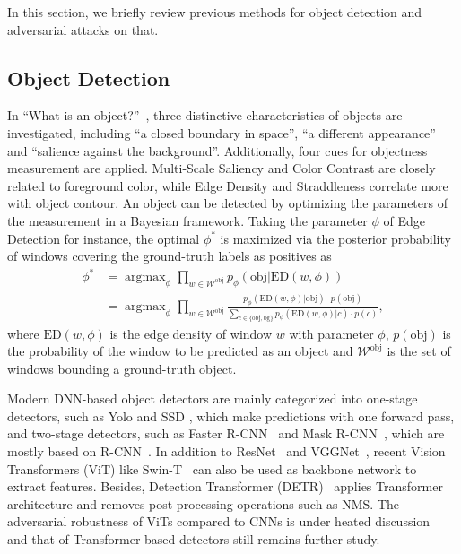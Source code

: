 \documentclass[times,twocolumn,final,authoryear]{elsarticle}
\begin{document}
In this section, we briefly review previous methods for object detection and adversarial attacks on that.

\subsection{Object Detection}
\label{sec:object}

In ``What is an object?''~\citep{alexe2010object}, three distinctive characteristics of objects are investigated, including ``a closed boundary in space'', ``a different appearance'' and ``salience against the background''. Additionally, four cues for objectness measurement are applied. Multi-Scale Saliency and Color Contrast are closely related to foreground color, while Edge Density and Straddleness correlate more with object contour. An object can be detected by optimizing the parameters of the measurement in a Bayesian framework.
Taking the parameter $\phi$ of Edge Detection for instance, the optimal $\phi^*$ is maximized via the posterior probability of windows covering the ground-truth labels as positives as
\begin{align}
\label{eq:ed}
    \phi^*&=\mathop{\arg\max}_\phi\prod_{w\in\mathcal{W}^{\text{obj}}}p_\phi(\text{obj}|\text{ED}(w,\phi)) \\
    &=\mathop{\arg\max}_\phi\prod_{w\in\mathcal{W}^{\text{obj}}}\frac{p_\phi(\text{ED}(w,\phi)|\text{obj})\cdot p(\text{obj})}{\sum_{c\in\{\text{obj},\text{bg}\}}p_\phi(\text{ED}(w,\phi)|c)\cdot p(c)}, \nonumber
\end{align}
where $\text{ED}(w,\phi)$ is the edge density of window $w$ with parameter $\phi$, $p(\text{obj})$ is the probability of the window to be predicted as an object and $\mathcal{W}^{\text{obj}}$ is the set of windows bounding a ground-truth object.


Modern DNN-based object detectors are mainly categorized into one-stage detectors, such as Yolo \citep{redmon2016you,redmon2016yolo9000,yolov3} and SSD \citep{Liu_2016ssd}, which make predictions with one forward pass, and two-stage detectors, such as Faster R-CNN~\citep{ren2015faster} and Mask R-CNN~\citep{he2017mask}, which are mostly based on R-CNN~\citep{girshick2014rich}. In addition to ResNet~\citep{he2016deep} and VGGNet~\citep{simonyan2014very}, recent Vision Transformers (ViT) like Swin-T~\citep{liu2021swin} can also be used as backbone network to extract features. Besides, Detection Transformer (DETR)~\citep{carion2020detr} applies Transformer~\citep{vaswani2017attention} architecture and removes post-processing operations such as NMS. The adversarial robustness of ViTs compared to CNNs is under heated discussion~\citep{mahmood2021robustness,bai2021transformers,shao2021adversarial} and that of Transformer-based detectors still remains further study.
\end{document}
